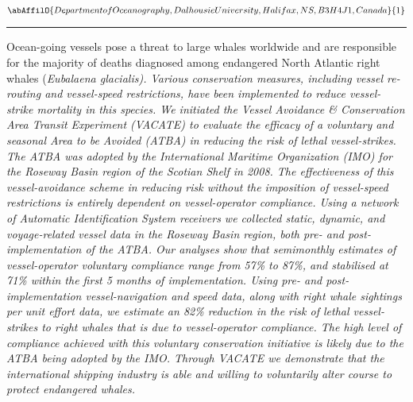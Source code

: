 \begin{center}
   \vspace{2 mm} \begin{center}
    \vspace{2 mm}\begin{center}
  
  $\abAffilO{Department of Oceanography, Dalhousie University, Halifax, NS, B3H 4J1, Canada}{1}$

  \end{center}
  \vspace{2 mm}
  \end{center}\end{center}
  \begin{center}\rule{0.70\linewidth}{0.5 pt}\end{center}

\noindent Ocean-going vessels pose a threat to large whales worldwide and are responsible for the majority of deaths diagnosed among endangered North Atlantic right whales (\sl Eubalaena glacialis\rm). Various conservation measures, including vessel re-routing and vessel-speed restrictions, have been implemented to reduce vessel-strike mortality in this species. We initiated the Vessel Avoidance & Conservation Area Transit Experiment (VACATE) to evaluate the efficacy of a voluntary and seasonal Area to be Avoided (ATBA) in reducing the risk of lethal vessel-strikes. The ATBA was adopted by the International Maritime Organization (IMO) for the Roseway Basin region of the Scotian Shelf in 2008. The effectiveness of this vessel-avoidance scheme in reducing risk without the imposition of vessel-speed restrictions is entirely dependent on vessel-operator compliance.  Using a network of Automatic Identification System receivers we collected static, dynamic, and voyage-related vessel data in the Roseway Basin region, both pre- and post-implementation of the ATBA.  Our analyses show that semimonthly estimates of vessel-operator voluntary compliance range from 57\% to 87\%, and stabilised at 71\% within the first 5 months of implementation.  Using pre- and post-implementation vessel-navigation and speed data, along with right whale sightings per unit effort data, we estimate an 82\% reduction in the risk of lethal vessel-strikes to right whales that is due to vessel-operator compliance. The high level of compliance achieved with this voluntary conservation initiative is likely due to the ATBA being adopted by the IMO. Through VACATE we demonstrate that the international shipping industry is able and willing to voluntarily alter course to protect endangered whales.  

